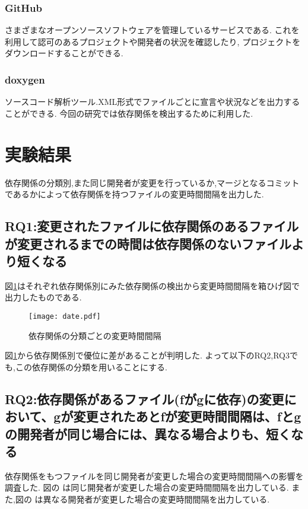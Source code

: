\documentclass[submit,ses,noauthor]{ipsj} %
\begin{document}
\subsubsection{GitHub}
さまざまなオープンソースソフトウェアを管理しているサービスである.
これを利用して認可のあるプロジェクトや開発者の状況を確認したり, プロジェクトをダウンロードすることができる.

\subsubsection{doxygen}
ソースコード解析ツール.XML形式でファイルごとに宣言や状況などを出力することができる.
今回の研究では依存関係を検出するために利用した.



\section{実験結果}\label{実験結果}
依存関係の分類別,また同じ開発者が変更を行っているか,マージとなるコミットであるかによって依存関係を持つファイルの変更時間間隔を出力した.

\subsection{RQ1:変更されたファイルに依存関係のあるファイルが変更されるまでの時間は依存関係のないファイルより短くなる}
図\ref{fig:subdate}はそれぞれ依存関係別にみた依存関係の検出から変更時間間隔を箱ひげ図で出力したものである.　　

\begin{figure}
\centering
\texttt{[image: date.pdf]}
\caption{依存関係の分類ごとの変更時間間隔}
\label{fig:subdate} 
\end{figure}




図\ref{fig:subdate}から依存関係別で優位に差があることが判明した.
よって以下のRQ2,RQ3でも,この依存関係の分類を用いることにする.


\subsection{RQ2:依存関係があるファイル(fがgに依存)の変更において、gが変更されたあとfが変更時間間隔は、fとgの開発者が同じ場合には、異なる場合よりも、短くなる}
依存関係をもつファイルを同じ開発者が変更した場合の変更時間間隔への影響を調査した.
図の\label{fig:author_true_subdate} は同じ開発者が変更した場合の変更時間間隔を出力している.
また,図の\label{fig:author_false_subdate} は異なる開発者が変更した場合の変更時間間隔を出力している.
\end{document}
